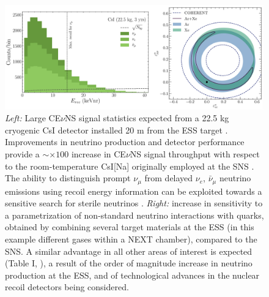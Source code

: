\documentclass[12pt]{article}
\begin{document}
\begin{figure}[H]
\begin{center}
\includegraphics[width=5.3in]{fig2.eps}
\caption{\label{fig:fig2}\scriptsize {\it Left:} Large CE$\nu$NS signal statistics expected from a 22.5 kg cryogenic CsI detector installed 20 m from the ESS target \cite{ESS}. Improvements in neutrino production and detector performance provide a $\sim\times100$ increase in CE$\nu$NS signal throughput with respect to the room-temperature CsI[Na] originally employed at the SNS \cite{ESS}. The ability to distinguish prompt $\nu_{\mu}$ from delayed $\nu_{e}$, $\bar{\nu}_{\mu}$ neutrino emissions using recoil energy information can be exploited towards a sensitive search for sterile neutrinos \cite{carlos}.  {\it Right:} increase in sensitivity to a parametrization of non-standard neutrino interactions with quarks, obtained by combining several target materials at the ESS (in this example different gases within a NEXT chamber), compared to the SNS. A similar advantage in all other areas of interest is expected (Table I, \cite{ESS}), a result of the order of magnitude increase in neutrino production at the ESS, and of technological advances in the nuclear recoil detectors being considered.}
\end{center}
\end{figure}
\end{document}

